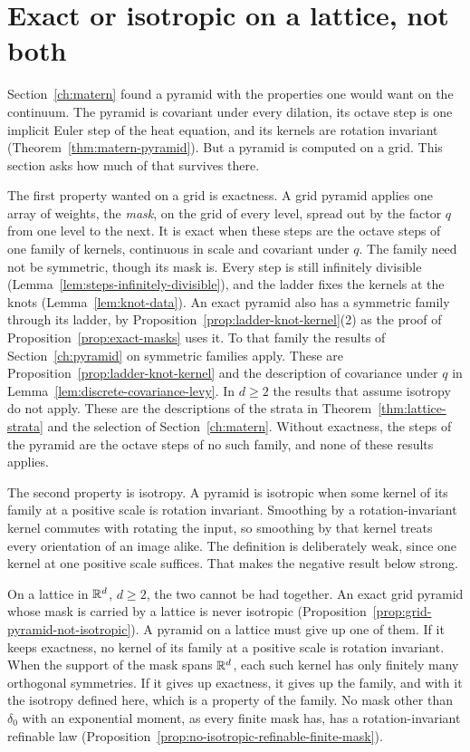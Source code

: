 \section{Exact or isotropic on a lattice, not both}
\label{ch:price}

Section~\ref{ch:matern} found a pyramid with the properties one would want on the continuum. The
\Matern{} pyramid is covariant under every dilation, its octave step is one implicit Euler step of
the heat equation, and its kernels are rotation invariant (Theorem~\ref{thm:matern-pyramid}). But a
pyramid is computed on a grid. This section asks how much of that survives there.

The first property wanted on a grid is exactness. A grid pyramid applies one array of weights, the
\emph{mask}, on the grid of every level, spread out by the factor $q$ from one level to the next. It
is exact when these steps are the octave steps of one family of kernels, continuous in scale and
covariant under $q$. The family need not be symmetric, though its mask is. Every step is still
infinitely divisible (Lemma~\ref{lem:steps-infinitely-divisible}), and the ladder fixes the kernels
at the knots (Lemma~\ref{lem:knot-data}). An exact pyramid also has a symmetric family through its
ladder, by Proposition~\ref{prop:ladder-knot-kernel}(2) as the proof of
Proposition~\ref{prop:exact-masks} uses it. To that family the results of Section~\ref{ch:pyramid}
on symmetric families apply. These are Proposition~\ref{prop:ladder-knot-kernel} and the
description of covariance under $q$ in Lemma~\ref{lem:discrete-covariance-levy}. In $d \ge 2$ the
results that assume isotropy do not apply. These are
the descriptions of the strata in Theorem~\ref{thm:lattice-strata} and the selection of
Section~\ref{ch:matern}. Without exactness, the steps of the pyramid are the octave steps of no
such family, and none of these results applies.

The second property is isotropy. A pyramid is isotropic when some kernel of its family at a
positive scale is rotation invariant. Smoothing by a rotation-invariant kernel commutes with
rotating the input, so smoothing by that kernel treats every orientation of an image alike. The
definition is deliberately weak, since one kernel at one positive scale suffices. That makes the
negative result below strong.

On a lattice in $\mathbb{R}^d$, $d \ge 2$, the two cannot be had together. An exact grid pyramid whose
mask is carried by a lattice is never isotropic (Proposition~\ref{prop:grid-pyramid-not-isotropic}).
A pyramid on a lattice must give up one of them. If it keeps exactness, no kernel of its family at a
positive scale is rotation invariant. When the support of the mask spans $\mathbb{R}^d$, each such kernel
has only finitely many orthogonal symmetries. If it gives up exactness, it gives up the family, and
with it the isotropy defined here, which is a property of the family. No mask other than
$\delta_0$ with an exponential moment, as every finite mask has, has a rotation-invariant refinable
law (Proposition~\ref{prop:no-isotropic-refinable-finite-mask}).


